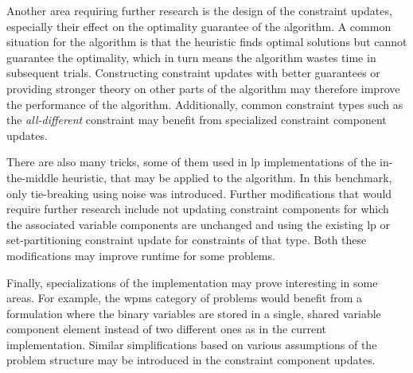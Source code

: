 Another area requiring further research is the design of the constraint updates, especially their effect on the optimality guarantee of the algorithm.
A common situation for the algorithm is that the heuristic finds optimal solutions but cannot guarantee the optimality, which in turn means the algorithm wastes time in subsequent trials.
Constructing constraint updates with better guarantees or providing stronger theory on other parts of the algorithm may therefore improve the performance of the algorithm.
Additionally, common constraint types such as the \emph{all-different} constraint may benefit from specialized constraint component updates.

There are also many tricks, some of them used in \gls{lp} implementations of the in-the-middle heuristic, that may be applied to the algorithm.
In this benchmark, only tie-breaking using noise was introduced.
Further modifications that would require further research include not updating constraint components for which the associated variable components are unchanged and using the existing \gls{lp} or set-partitioning constraint update \parencite[\pno~102]{Wedelin08} for constraints of that type.
Both these modifications may improve runtime for some problems.

Finally, specializations of the implementation may prove interesting in some areas.
For example, the \gls{wpms} category of problems would benefit from a formulation where the binary variables are stored in a single, shared variable component element instead of two different ones as in the current implementation.
Similar simplifications based on various assumptions of the problem structure may be introduced in the constraint component updates.



